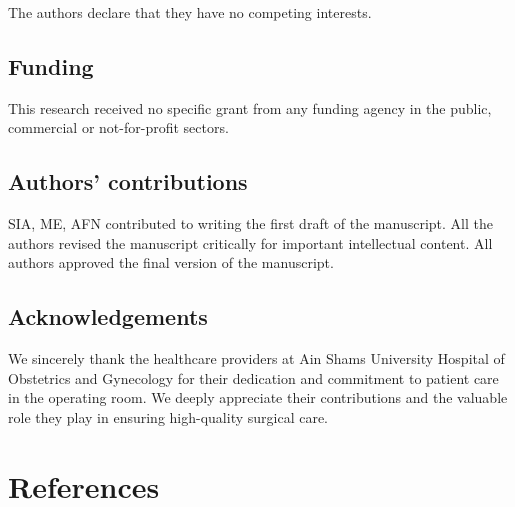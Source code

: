 \documentclass[
  letterpaper,
  DIV=11,
  numbers=noendperiod]{scrartcl}
\begin{document}
The authors declare that they have no competing interests.

\subsection{Funding}\label{funding}

This research received no specific grant from any funding agency in the
public, commercial or not-for-profit sectors.

\subsection{Authors' contributions}\label{authors-contributions}

SIA, ME, AFN contributed to writing the first draft of the manuscript.
All the authors revised the manuscript critically for important
intellectual content. All authors approved the final version of the
manuscript.

\subsection{Acknowledgements}\label{acknowledgements}

We sincerely thank the healthcare providers at Ain Shams University
Hospital of Obstetrics and Gynecology for their dedication and
commitment to patient care in the operating room. We deeply appreciate
their contributions and the valuable role they play in ensuring
high-quality surgical care.

\section*{References}\label{references}
\end{document}

